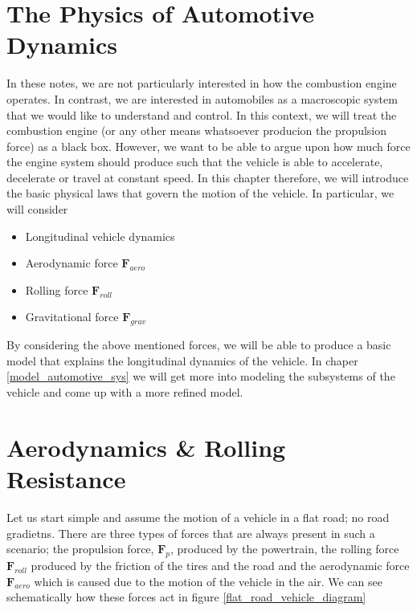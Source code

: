 \section{The Physics of Automotive Dynamics}
\label{physics-automotive_dynamics}
In these notes, we are not particularly interested in how the combustion engine operates. In contrast, we are interested in automobiles as a macroscopic system that we would
like to understand and control. In this context, we will treat the combustion engine (or any other means whatsoever producion the propulsion force) as a black box.
However, we want to be able to argue upon how much force the engine system should produce such that the vehicle is able to accelerate, decelerate or travel at constant speed.
In this chapter therefore, we will introduce the basic physical laws that govern the motion of the vehicle. In particular, we will consider

\begin{itemize}
\item Longitudinal vehicle dynamics
\item Aerodynamic force $\mathbf{F}_{aero}$
\item Rolling force $\mathbf{F}_{roll}$
\item Gravitational force $\mathbf{F}_{grav}$
\end{itemize}

By considering the above mentioned forces, we will be able to produce a basic model that explains the longitudinal dynamics of the vehicle. In chaper \ref{model_automotive_sys} we will get more into modeling the subsystems of the vehicle and come up with a more refined model.


\section{Aerodynamics \& Rolling Resistance}

Let us start simple and assume the motion of a vehicle in a flat road; no road gradietns. There are three types of forces that are always present in such a scenario; the propulsion force, $\mathbf{F}_{p}$, produced by the  powertrain, the rolling force $\mathbf{F}_{roll}$ produced by the friction of the tires and the road and the aerodynamic force  $\mathbf{F}_{aero}$ which is caused due to the motion of the vehicle in the air. We can see schematically how these forces act in figure \ref{flat_road_vehicle_diagram}

